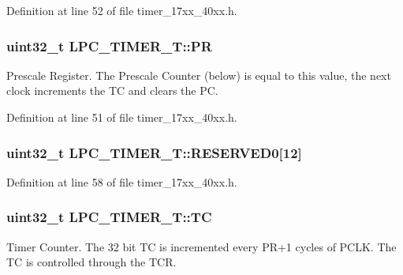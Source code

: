 Definition at line 52 of file timer\+\_\+17xx\+\_\+40xx.\+h.

\subsubsection[{\texorpdfstring{PR}{PR}}]{ uint32\+\_\+t L\+P\+C\+\_\+\+T\+I\+M\+E\+R\+\_\+\+T\+::\+PR}\hypertarget{structLPC__TIMER__T_ab803475dcfb9c751b2b8d02f02cb9d95}{}\label{structLPC__TIMER__T_ab803475dcfb9c751b2b8d02f02cb9d95}
Prescale Register. The Prescale Counter (below) is equal to this value, the next clock increments the TC and clears the PC. 

Definition at line 51 of file timer\+\_\+17xx\+\_\+40xx.\+h.

\subsubsection[{\texorpdfstring{R\+E\+S\+E\+R\+V\+E\+D0}{RESERVED0}}]{ uint32\+\_\+t L\+P\+C\+\_\+\+T\+I\+M\+E\+R\+\_\+\+T\+::\+R\+E\+S\+E\+R\+V\+E\+D0\mbox{[}12\mbox{]}}\hypertarget{structLPC__TIMER__T_ac55f208ad800371ff9db0ba9f49ec716}{}\label{structLPC__TIMER__T_ac55f208ad800371ff9db0ba9f49ec716}


Definition at line 58 of file timer\+\_\+17xx\+\_\+40xx.\+h.

\subsubsection[{\texorpdfstring{TC}{TC}}]{ uint32\+\_\+t L\+P\+C\+\_\+\+T\+I\+M\+E\+R\+\_\+\+T\+::\+TC}\hypertarget{structLPC__TIMER__T_ac92507831988bc15ddc0fbc30ab31bf9}{}\label{structLPC__TIMER__T_ac92507831988bc15ddc0fbc30ab31bf9}
Timer Counter. The 32 bit TC is incremented every P\+R+1 cycles of P\+C\+LK. The TC is controlled through the T\+CR. 

